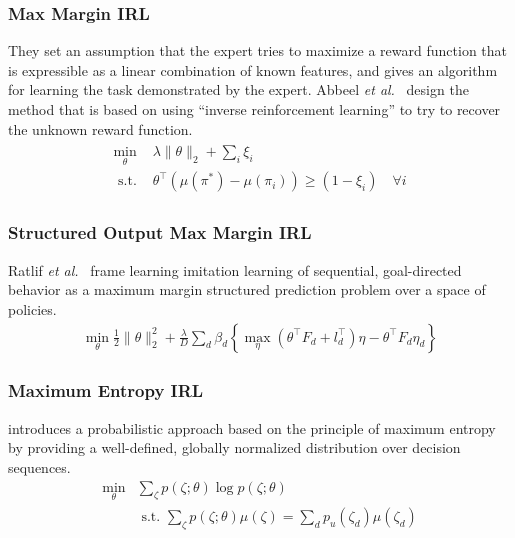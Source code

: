 \documentclass[11pt]{article}
\begin{document}
\subsubsection{Max Margin IRL}
They set an assumption that the expert tries to maximize a reward function that is expressible as a linear combination of known features, and gives an algorithm for learning the task demonstrated by the expert. Abbeel \emph{et al.}~\cite{abbeel2004apprenticeship} design the method that is based on using “inverse reinforcement learning” to try to recover the unknown reward function.
\begin{align}
    \begin{array}{ll}\min _{\theta} & \lambda\|\theta\|_{2}+\sum_{i} \xi_{i} \\ \text { s.t. } & \theta^{\top}\left(\mu\left(\pi^{*}\right)-\mu\left(\pi_{i}\right)\right) \geq\left(1-\xi_{i}\right) \quad \forall i\end{array}
\end{align}

\subsubsection{Structured Output Max Margin IRL}
Ratlif \emph{et al.}~\cite{ratliff2006maximum} frame learning imitation learning of sequential, goal-directed behavior as a maximum margin structured prediction problem over a space of policies.
\begin{align}
    \min _{\theta} \frac{1}{2}\|\theta\|_{2}^{2}+\frac{\lambda}{D} \sum_{d} \beta_{d}\left\{\max _{\eta}\left(\theta^{\top} F_{d}+l_{d}^{\top}\right) \eta-\theta^{\top} F_{d} \eta_{d}\right\}
\end{align}



\subsubsection{Maximum Entropy IRL}
\cite{ziebart2008maximum} introduces a probabilistic approach based on the principle of maximum entropy by providing a well-defined, globally normalized distribution over decision sequences.
\begin{align}
   \min _{\theta} & \sum_{\zeta} p(\zeta ; \theta) \log p(\zeta ; \theta) \\ & \text { s.t. } \sum_{\zeta} p(\zeta ; \theta) \mu(\zeta)=\sum_{d} p_{u}\left(\zeta_{d}\right) \mu\left(\zeta_{d}\right) 
\end{align}
\end{document}
